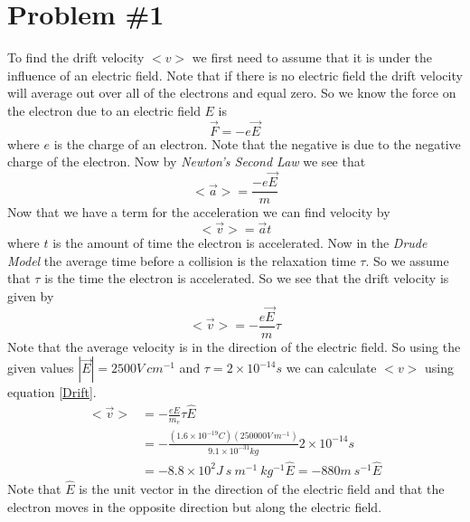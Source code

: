 \documentclass[11pt]{article}
\numberwithin{equation}{section}
\begin{document}


\section{Problem \#1}
To find the drift velocity $<v>$ we first need to assume that it is under the influence of an electric field. Note that if there is no electric field the drift velocity will average out over all of the electrons and equal zero. So we know the force on the electron due to an electric field $E$ is
$$\vec{F} = -e\vec{E}$$
where $e$ is the charge of an electron. Note that the negative is due to the negative charge of the electron. Now by \emph{Newton's Second Law} we see that
$$<\vec{a}> = \frac{-e\vec{E}}{m}$$
Now that we have a term for the acceleration we can find velocity by 
$$<\vec{v}> = \vec{a}t$$
where $t$ is the amount of time the electron is accelerated. Now in the \emph{Drude Model} the average time before a collision is the relaxation time $\tau$. So we assume that $\tau$ is the time the electron is accelerated. So we see that the drift velocity is given by
\begin{equation}
<\vec{v}> = -\frac{e\vec{E}}{m}\tau
\label{Drift}
\end{equation}
Note that the average velocity is in the direction of the electric field. So using the given values $|\vec{E}| = 2500\unit{V\ cm^{-1}}$ and $\tau = 2\times10^{-14}\unit{s}$ we can calculate $<v>$ using equation \ref{Drift}.
\begin{align*}
<\vec{v}> &= -\frac{eE}{m_e}\tau\hat{E}\\
&= -\frac{(1.6\times10^{-19}\unit{C})(250000\unit{V\ m^{-1}})}{9.1\times10^{-31}\unit{kg}}2\times10^{-14}\unit{s}\\
&= -8.8\times10^{2}\unit{J\ s\ m^{-1}\ kg^{-1}}\hat{E} = -880\unit{m\ s^{-1}}\hat{E}
\end{align*}
Note that $\hat{E}$ is the unit vector in the direction of the electric field and that the electron moves in the opposite direction but along the electric field.
\end{document}
